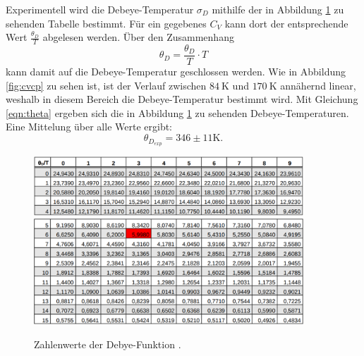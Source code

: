 Experimentell wird die Debeye-Temperatur $\sigma_D$ mithilfe der in Abbildung \ref{fig:deb} zu sehenden Tabelle bestimmt. Für ein gegebenes $C_V$ kann dort der entsprechende Wert $\frac{\theta_D}{T}$ abgelesen werden. Über den Zusammenhang
\begin{equation}
    \theta_D = \frac{\theta_D}{T} \cdot T
    \label{eqn:theta}
\end{equation}
kann damit auf die Debeye-Temperatur geschlossen werden.
Wie in Abbildung \ref{fig:cvcp} zu sehen ist, ist der Verlauf zwischen $\SI{84}{\kelvin}$ und $\SI{170}{\kelvin}$ annähernd linear, weshalb in diesem Bereich die Debeye-Temperatur bestimmt wird.
Mit Gleichung \eqref{eqn:theta}
ergeben sich die in Abbildung \ref{fig:deb} zu sehenden Debeye-Temperaturen. 
Eine Mittelung über alle Werte ergibt:
\begin{equation}
    \theta_{D_{exp}} = 346 \pm 11 \si{\kelvin}.
\end{equation}
\begin{figure}
    \centering
    \includegraphics[width=0.9\textwidth]{content/images/table1.png}
    \includegraphics[width=0.9\textwidth]{content/images/table2.png}
    \caption{Zahlenwerte der Debye-Funktion \cite{anleitung}.}
    \label{fig:deb}
\end{figure}
